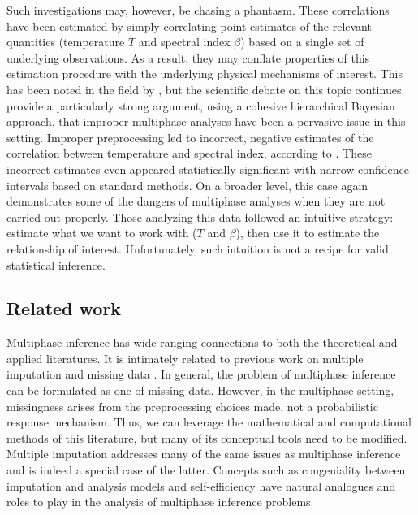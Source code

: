 Such investigations may, however, be chasing a phantasm.
These correlations have been estimated by simply correlating point estimates of the relevant quantities (temperature $T$ and spectral index $\beta$) based on a single set of underlying observations.
As a result, they may conflate properties of this estimation procedure with the underlying physical mechanisms of interest.
This has been noted in the field by \citet{Shetty2009}, but the scientific debate on this topic continues.
\cite{Kelly2012} provide a particularly strong argument, using a cohesive hierarchical Bayesian approach, that improper multiphase analyses have been a pervasive issue in this setting.
Improper preprocessing led to incorrect, negative estimates of the correlation between temperature and spectral index, according to \cite{Kelly2012}.
These incorrect estimates even appeared statistically significant with narrow confidence intervals based on standard methods.
On a broader level, this case again demonstrates some of the dangers of multiphase analyses when they are not carried out properly.
Those analyzing this data followed an intuitive strategy: estimate what we want to work with ($T$ and $\beta$), then use it to estimate the relationship of interest.
Unfortunately, such intuition is not a recipe for valid statistical inference.%

\subsection{Related work}

Multiphase inference has wide-ranging connections to both the theoretical and applied literatures.
It is intimately related to previous work on multiple imputation and missing data \citep{Rubin1976,Rubin1987,Meng1994,Rubin1996,Meng2003,Xie2012}.
In general, the problem of multiphase inference can be formulated as one of missing data.
However, in the multiphase setting, missingness arises from the preprocessing choices made, not a probabilistic response mechanism.
Thus, we can leverage the mathematical and computational methods of this literature, but many of its conceptual tools need to be modified.
Multiple imputation addresses many of the same issues as multiphase inference and is indeed a special case of the latter.
Concepts such as congeniality between imputation and analysis models and self-efficiency \citep{Meng1994} have natural analogues and roles to play in the analysis of multiphase inference problems.

